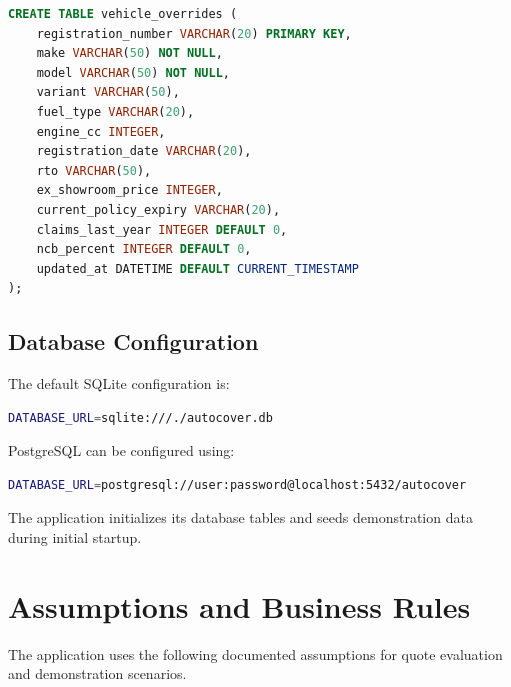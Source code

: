 \documentclass[11pt,a4paper]{article}
\begin{document}
\begin{lstlisting}[language=SQL,caption={Vehicle Overrides Table Schema}]
CREATE TABLE vehicle_overrides (
    registration_number VARCHAR(20) PRIMARY KEY,
    make VARCHAR(50) NOT NULL,
    model VARCHAR(50) NOT NULL,
    variant VARCHAR(50),
    fuel_type VARCHAR(20),
    engine_cc INTEGER,
    registration_date VARCHAR(20),
    rto VARCHAR(50),
    ex_showroom_price INTEGER,
    current_policy_expiry VARCHAR(20),
    claims_last_year INTEGER DEFAULT 0,
    ncb_percent INTEGER DEFAULT 0,
    updated_at DATETIME DEFAULT CURRENT_TIMESTAMP
);
\end{lstlisting}

\subsection{Database Configuration}

The default SQLite configuration is:

\begin{lstlisting}[language=bash]
DATABASE_URL=sqlite:///./autocover.db
\end{lstlisting}

PostgreSQL can be configured using:

\begin{lstlisting}[language=bash]
DATABASE_URL=postgresql://user:password@localhost:5432/autocover
\end{lstlisting}

The application initializes its database tables and seeds
demonstration data during initial startup.


\section{Assumptions and Business Rules}

The application uses the following documented assumptions
for quote evaluation and demonstration scenarios.
\end{document}
